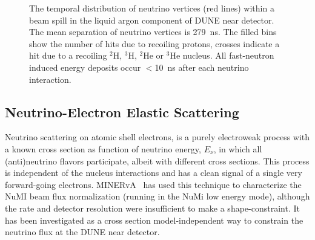 \begin{figure}[htb]
	\caption{The temporal distribution of neutrino vertices (red lines) within a beam spill in the liquid argon component of DUNE near detector.
		The mean separation of neutrino vertices is \SI{279}{\nano\second}. The filled bins show the number of hits due to recoiling protons, crosses indicate a hit due to a recoiling $^{2}$H, $^3$H, $^2$He or $^3$He nucleus.
		All fast-neutron induced energy deposits occur $<$\SI{10}{\nano\second} after each neutrino interaction.}
	\label{fig:Timing}
\end{figure}

	
\subsection{Neutrino-Electron Elastic Scattering}

Neutrino scattering on atomic shell electrons, %
 is a purely electroweak process with a known cross section as function of neutrino energy, $E_{\nu}$, in which all (anti)neutrino flavors participate, albeit with different cross sections. This process is independent of the nucleus interactions and has a clean signal of a single very forward-going electrons. MINERvA~\cite{Park:2015eqa} has used this technique to characterize the NuMI beam flux normalization (running in the NuMi low energy mode), although the rate and detector resolution were insufficient to make a shape-constraint. It has been investigated as a cross section model-independent way to constrain the neutrino flux at the DUNE near detector.

